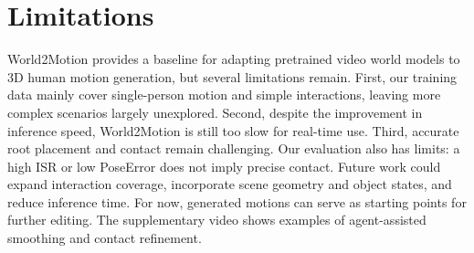 \section{Limitations}
\label{sec:limitations}
World2Motion provides a baseline for adapting pretrained video world models to 3D human motion generation, but several limitations remain. First, our training data mainly cover single-person motion and simple interactions, leaving more complex scenarios largely unexplored. Second, despite the improvement in inference speed, World2Motion is still too slow for real-time use. Third, accurate root placement and contact remain challenging. Our evaluation also has limits: a high ISR or low PoseError does not imply precise contact. Future work could expand interaction coverage, incorporate scene geometry and object states, and reduce inference time. For now, generated motions can serve as starting points for further editing. The supplementary video shows examples of agent-assisted smoothing and contact refinement.


